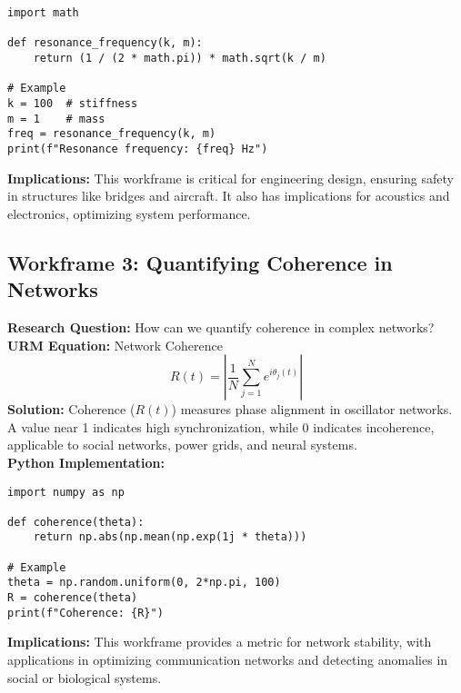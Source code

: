 \documentclass[12pt]{article}
\begin{document}
\begin{lstlisting}[caption={Resonance Frequency Calculation}]
import math

def resonance_frequency(k, m):
    return (1 / (2 * math.pi)) * math.sqrt(k / m)

# Example
k = 100  # stiffness
m = 1    # mass
freq = resonance_frequency(k, m)
print(f"Resonance frequency: {freq} Hz")
\end{lstlisting}
\textbf{Implications:} This workframe is critical for engineering design, ensuring safety in structures like bridges and aircraft. It also has implications for acoustics and electronics, optimizing system performance.

\clearpage

\subsection{Workframe 3: Quantifying Coherence in Networks}
\textbf{Research Question:} How can we quantify coherence in complex networks? \\
\textbf{URM Equation:} Network Coherence
\[
R(t) = \left| \frac{1}{N} \sum_{j=1}^N e^{i \theta_j(t)} \right|
\]
\textbf{Solution:} Coherence (\(R(t)\)) measures phase alignment in oscillator networks. A value near 1 indicates high synchronization, while 0 indicates incoherence, applicable to social networks, power grids, and neural systems. \\
\textbf{Python Implementation:}
\begin{lstlisting}[caption={Network Coherence Calculation}]
import numpy as np

def coherence(theta):
    return np.abs(np.mean(np.exp(1j * theta)))

# Example
theta = np.random.uniform(0, 2*np.pi, 100)
R = coherence(theta)
print(f"Coherence: {R}")
\end{lstlisting}
\textbf{Implications:} This workframe provides a metric for network stability, with applications in optimizing communication networks and detecting anomalies in social or biological systems.

\clearpage
\end{document}
